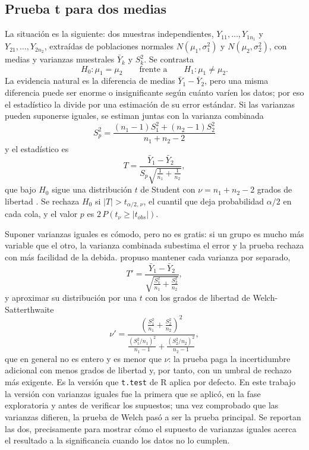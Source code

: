 \subsection{Prueba t para dos medias}
La situación es la siguiente: dos muestras independientes, $Y_{11}, \dots, Y_{1n_1}$ y
$Y_{21}, \dots, Y_{2n_2}$, extraídas de poblaciones normales $N(\mu_1, \sigma_1^2)$ y
$N(\mu_2, \sigma_2^2)$, con medias y varianzas muestrales $\bar{Y}_k$ y $S_k^2$. Se contrasta
\begin{equation}
H_{0} : \mu_{1} = \mu_{2} \qquad \text{frente a} \qquad H_{1} : \mu_{1} \neq \mu_{2}.
\label{eq:hip-medias}
\end{equation}
La evidencia natural es la diferencia de medias $\bar{Y}_1 - \bar{Y}_2$, pero una misma diferencia
puede ser enorme o insignificante según cuánto varíen los datos; por eso el estadístico la divide por
una estimación de su error estándar. Si las varianzas pueden suponerse iguales, se estiman juntas con
la varianza combinada
\begin{equation}
S_{p}^2 = \frac{(n_{1}-1)S_{1}^{2} + (n_{2}-1)S_{2}^{2}}{n_{1} + n_{2} - 2}
\label{eq:varianza-combinada}
\end{equation}
y el estadístico es
\begin{equation}
T = \frac{\bar{Y}_{1} - \bar{Y}_{2}}{S_{p}\sqrt{\frac{1}{n_{1}} + \frac{1}{n_{2}}}},
\label{eq:t-statistic}
\end{equation}
que bajo $H_0$ sigue una distribución $t$ de Student con $\nu = n_1 + n_2 - 2$ grados de libertad
\citep{wackerly2002estadistica}. Se rechaza $H_0$ si $|T| > t_{\alpha/2,\,\nu}$, el cuantil que deja
probabilidad $\alpha/2$ en cada cola, y el valor $p$ es $2\,P(t_\nu \geq |t_{obs}|)$.

Suponer varianzas iguales es cómodo, pero no es gratis: si un grupo es mucho más variable que el
otro, la varianza combinada subestima el error y la prueba rechaza con más facilidad de la debida.
\citet{welch1947generalization} propuso mantener cada varianza por separado,
\begin{equation}
T' = \frac{\bar{Y}_{1} - \bar{Y}_{2}}{\sqrt{\frac{S_{1}^{2}}{n_{1}} + \frac{S_{2}^{2}}{n_{2}}}},
\label{eq:welch-statistic}
\end{equation}
y aproximar su distribución por una $t$ con los grados de libertad de Welch-Satterthwaite
\begin{equation}
\nu' = \frac{\left(\frac{S_1^2}{n_1} + \frac{S_2^2}{n_2}\right)^2}
{\frac{(S_1^2/n_1)^2}{n_1 - 1} + \frac{(S_2^2/n_2)^2}{n_2 - 1}},
\label{eq:welch-gl}
\end{equation}
que en general no es entero y es menor que $\nu$: la prueba paga la incertidumbre adicional con
menos grados de libertad y, por tanto, con un umbral de rechazo más exigente. Es la versión que
\texttt{t.test} de R aplica por defecto. En este trabajo la versión con varianzas iguales fue la
primera que se aplicó, en la fase exploratoria y antes de verificar los supuestos; una vez
comprobado que las varianzas difieren, la prueba de Welch pasó a ser la prueba principal. Se reportan
las dos, precisamente para mostrar cómo el supuesto de varianzas iguales acerca el resultado a la
significancia cuando los datos no lo cumplen.

